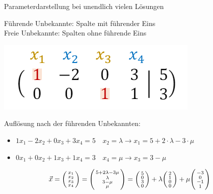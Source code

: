     \begin{KR}{Parameterdarstellung} bei unendlich vielen Lösungen

        \begin{minipage}{0.74\linewidth}
            Führende Unbekannte: Spalte mit führender Eins\\
            Freie Unbekannte: Spalten ohne führende Eins
        \end{minipage}
        \begin{minipage}{0.25\linewidth}
            \includegraphics[width=1\linewidth]{images/parameterdarstellung_lgs.png}
        \end{minipage}

        \vspace{1mm}
        
        Auflösung nach der führenden Unbekannten:
        \begin{itemize}
            \item $1 x_1 - 2 x_2 + 0 x_3 + 3 x_4 = 5 \quad x_2 = \lambda \rightarrow x_1 = 5 + 2 \cdot \lambda - 3 \cdot \mu$
            \item $0 x_1 + 0 x_2 + 1 x_3 + 1 x_4 = 3 \quad x_4 = \mu \rightarrow x_3 = 3 - \mu$    
        \end{itemize}
        \vspace*{2mm}
        $$ \vec{x} = \begin{psmallmatrix} x_1 \\ x_2 \\ x_3 \\ x_4 \end{psmallmatrix} 
        = \begin{psmallmatrix} 5 + 2 \lambda - 3 \mu \\ \lambda \\ 3 - \mu \\ \mu \end{psmallmatrix} 
        = \begin{psmallmatrix} 5 \\ 0 \\ 3 \\ 0 \end{psmallmatrix} + \lambda \begin{psmallmatrix} 2 \\ 1 \\ 0 \\ 0 \end{psmallmatrix} + \mu \begin{psmallmatrix} -3 \\ 0 \\ -1 \\ 1 \end{psmallmatrix}$$
    \end{KR}

